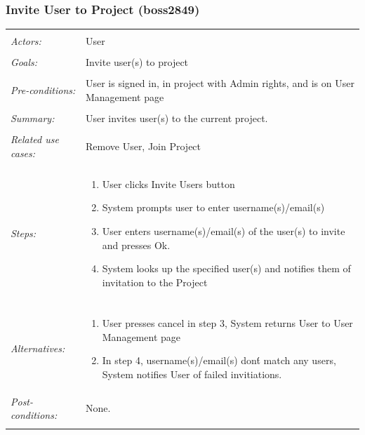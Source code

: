 \documentclass[11pt]{article}
\begin{document}
\subsubsection{Invite User to Project  (boss2849)}
\begin{tabular}{ p{2cm} p{12cm} }
 \hline
 \\
 \textit{Actors:} & User \\ 
 \\
 \textit{Goals:} & Invite user(s) to project \\
 \\
 \textit{Pre-conditions:} & User is signed in, in project with Admin rights, and is on User Management page \\
 \\
 \textit{Summary:} & User invites user(s) to the current project. \\ 
 \\
 \textit{Related use cases:} & Remove User, Join Project \\ 
 \\
 \textit{Steps:} & \begin{enumerate}
  \item User clicks Invite Users button
  \item System prompts user to enter username(s)/email(s)
  \item User enters username(s)/email(s) of the user(s) to invite and presses Ok.
  \item System looks up the specified user(s) and notifies them of invitation to the Project
 \end{enumerate} \\
 \\
 \textit{Alternatives:} & \begin{enumerate}
  \item User presses cancel in step 3, System returns User to User Management page
  \item In step 4, username(s)/email(s) don\'t match any users, System notifies User of failed invitiations.
 \end{enumerate} 
 \\
 \textit{Post-conditions:} & None. \\
 \\
\hline
\end{tabular}
\end{document}
